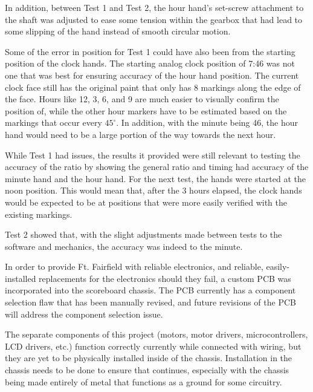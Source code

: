 \documentclass[11pt]{article}
\begin{document}
In addition, between Test 1 and Test 2, the hour hand's set-screw attachment to the shaft was adjusted to ease some tension within the gearbox that had lead to some slipping of the hand instead of smooth circular motion. 

Some of the error in position for Test 1 could have also been from the starting position of the clock hands. The starting analog clock position of 7:46 was not one that was best for ensuring accuracy of the hour hand position. The current clock face still has the original paint that only has 8 markings along the edge of the face. Hours like 12, 3, 6, and 9 are much easier to visually confirm the position of, while the other hour markers have to be estimated based on the markings that occur every $45^\circ$. In addition, with the minute being 46, the hour hand would need to be a large portion of the way towards the next hour. 

While Test 1 had issues, the results it provided were still relevant to testing the accuracy of the ratio by showing the general ratio and timing had accuracy of the minute hand and the hour hand. For the next test, the hands were started at the noon position. This would mean that, after the 3 hours elapsed, the clock hands would be expected to be at positions that were more easily verified with the existing markings. 

Test 2 showed that, with the slight adjustments made between tests to the software and mechanics, the accuracy was indeed to the minute. 


In order to provide Ft. Fairfield with reliable electronics, and reliable, easily-installed replacements for the electronics should they fail, a custom PCB was incorporated into the scoreboard chassis. The PCB currently has a component selection flaw that has been manually revised, and future revisions of the PCB will address the component selection issue.

The separate components of this project (motors, motor drivers, microcontrollers, LCD drivers, etc.) function correctly currently while connected with wiring, but they are yet to be physically installed inside of the chassis. 
Installation in the chassis needs to be done to ensure that continues, especially with the chassis being made entirely of metal that functions as a ground for some circuitry. 
\end{document}
